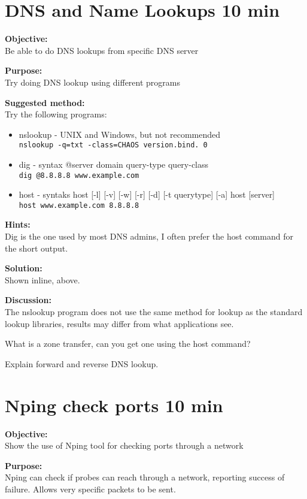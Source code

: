 \documentclass[a4paper,11pt,notitlepage]{report}
\begin{document}
\chapter{DNS and Name Lookups 10 min}
\label{ex:basic-dns-lookup}



{\bf Objective:}\\
Be able to do DNS lookups from specific DNS server

{\bf Purpose:}\\
Try doing DNS lookup using different programs

{\bf Suggested method:}\\
Try the following programs:
\begin{itemize}
\item nslookup - UNIX and Windows, but not recommended\\
\verb+nslookup -q=txt -class=CHAOS version.bind. 0+
\item dig - syntax @server domain query-type query-class\\
\verb+dig @8.8.8.8 www.example.com+
\item host - syntaks host [-l] [-v] [-w] [-r] [-d] [-t querytype] [-a] host [server]\\
\verb+host www.example.com 8.8.8.8+
\end{itemize}

{\bf Hints:}\\
Dig is the one used by most DNS admins, I often prefer the host command for the short output.

{\bf Solution:}\\
Shown inline, above.

{\bf Discussion:}\\
The nslookup program does not use the same method for lookup as the standard lookup libraries, results may differ from what applications see.

What is a zone transfer, can you get one using the host command?

Explain forward and reverse DNS lookup.




\chapter{Nping check ports 10 min}
\label{ex:nping-tcp}
{\bf Objective:} \\
Show the use of Nping tool for checking ports through a network

{\bf Purpose:}\\
Nping can check if probes can reach through a network, reporting success of failure. Allows very specific packets to be sent.
\end{document}
